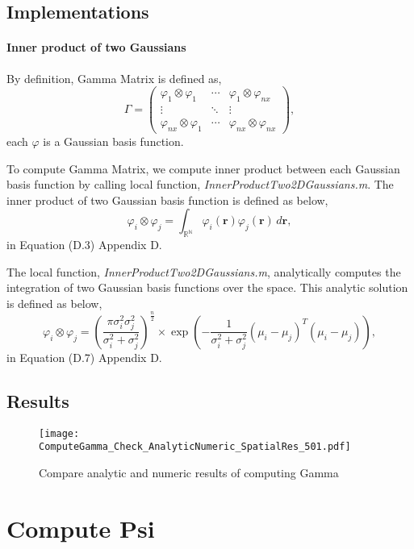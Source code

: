 \documentclass[a4paper, 12pt, english]{article}
\begin{document}
\subsection{Implementations}
\paragraph{Inner product of two Gaussians\newline}
By definition, Gamma Matrix is defined as,
$$\Gamma = \left(
\begin{array}{ccc}
\varphi_1\otimes\varphi_1&\cdots&\varphi_1\otimes\varphi_{nx}\\
\vdots&\ddots&\vdots\\
\varphi_{nx}\otimes\varphi_1&\cdots&\varphi_{nx}\otimes\varphi_{nx}
\end{array}
\right),$$ each $ \varphi$ is a Gaussian basis function.\par
To compute Gamma Matrix, we compute inner product between each Gaussian basis
function by calling local function, \textit{InnerProductTwo2DGaussians.m}. \newline The inner
product of two Gaussian basis function is defined as below,
$$\varphi_i\otimes\varphi_j=\int_{\mathbb{R}^\mathbb{N}}\varphi_i(\boldsymbol{r})\varphi_j(\boldsymbol{r})\,d\boldsymbol{r},$$
in Equation (D.3) Appendix D.\par
The local function, \textit{InnerProductTwo2DGaussians.m}, analytically computes the
integration of two Gaussian basis functions over the space. This analytic solution
is defined as below,
$$\varphi_i\otimes\varphi_j = \left(\frac{\pi\sigma^2_i\sigma^2_j}{\sigma^2_i+\sigma^2_j}\right)^{\frac{n}{2}}
\times\exp{\left(-\frac{1}{\sigma^2_i+\sigma^2_j}(\mu_i-\mu_j)^T(\mu_i-\mu_j)\right)}, $$
in Equation (D.7) Appendix D.
\subsection{Results}
\begin{figure}[H]
\centering
\texttt{[image: ComputeGamma\_Check\_AnalyticNumeric\_SpatialRes\_501.pdf]}
\caption{Compare analytic and numeric results of computing Gamma}
\end{figure}

\newpage



\section{Compute Psi}
\end{document}
